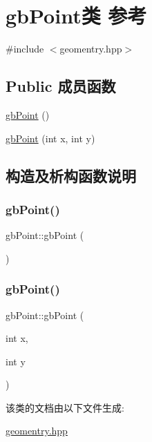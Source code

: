 \hypertarget{classgb_point}{}\section{gb\+Point类 参考}
\label{classgb_point}


{\ttfamily \#include $<$geomentry.\+hpp$>$}

\subsection*{Public 成员函数}
\begin{DoxyCompactItemize}
\item 
\mbox{\hyperlink{classgb_point_a7d9c23d0ce16d07461f66ea44f7cde20}{gb\+Point}} ()
\item 
\mbox{\hyperlink{classgb_point_a996a435065205fc3122ee264d30e1b87}{gb\+Point}} (int x, int y)
\end{DoxyCompactItemize}


\subsection{构造及析构函数说明}
\mbox{\label{classgb_point_a7d9c23d0ce16d07461f66ea44f7cde20}} 
\subsubsection{\texorpdfstring{gbPoint()}{gbPoint()}\hspace{0.1cm}{\footnotesize\ttfamily [1/2]}}
{\footnotesize\ttfamily gb\+Point\+::gb\+Point (\begin{DoxyParamCaption}{ }\end{DoxyParamCaption})}

\mbox{\label{classgb_point_a996a435065205fc3122ee264d30e1b87}} 
\subsubsection{\texorpdfstring{gbPoint()}{gbPoint()}\hspace{0.1cm}{\footnotesize\ttfamily [2/2]}}
{\footnotesize\ttfamily gb\+Point\+::gb\+Point (\begin{DoxyParamCaption}\item[{int}]{x,  }\item[{int}]{y }\end{DoxyParamCaption})}



该类的文档由以下文件生成\+:\begin{DoxyCompactItemize}
\item 
\mbox{\hyperlink{geomentry_8hpp}{geomentry.\+hpp}}\end{DoxyCompactItemize}
